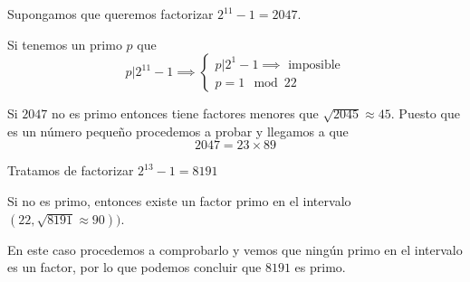 \begin{example}
Supongamos que queremos factorizar $2^{11}-1=2047$.

Si tenemos un primo $p$ que
\[p|2^11-1\implies \left\{ \begin{array}{l}p|2^1-1 \implies \text{ imposible}\\ p =1 \mod 22 \end{array}\right.\]

Si $2047$ no es primo entonces tiene factores menores que $\sqrt{2045}\approx 45$. Puesto que es un número pequeño procedemos a probar y llegamos a que
\[2047 = 23 \times 89\]
\end{example}
\begin{example}
Tratamos de factorizar $2^{13}-1=8191$

Si no es primo, entonces existe un factor primo en el intervalo $(22,\sqrt{8191}\approx90))$.

En este caso procedemos a comprobarlo y vemos que ningún primo en el intervalo es un factor, por lo que podemos concluir que $8191$ es primo.
\end{example}


